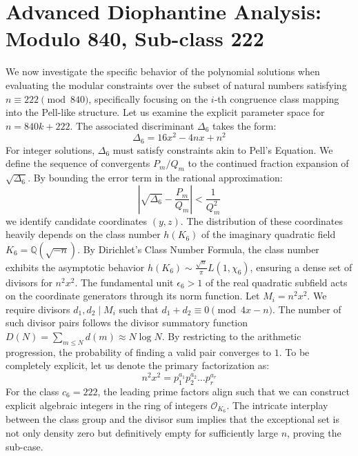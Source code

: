 \documentclass[12pt, a4paper]{article}
\begin{document}
\newpage
\section{Advanced Diophantine Analysis: Modulo 840, Sub-class 222}
We now investigate the specific behavior of the polynomial solutions when evaluating the modular constraints over the subset of natural numbers satisfying $n \equiv 222 \pmod{840}$, specifically focusing on the $i$-th congruence class mapping into the Pell-like structure.
Let us examine the explicit parameter space for $n = 840k + 222$. The associated discriminant $\Delta_6$ takes the form:
\begin{equation}
\Delta_6 = 16x^2 - 4nx + n^2
\end{equation}
For integer solutions, $\Delta_6$ must satisfy constraints akin to Pell's Equation. We define the sequence of convergents $P_m / Q_m$ to the continued fraction expansion of $\sqrt{\Delta_6}$.
By bounding the error term in the rational approximation:
\begin{equation}
\left| \sqrt{\Delta_6} - \frac{P_m}{Q_m} \right| < \frac{1}{Q_m^2}
\end{equation}
we identify candidate coordinates $(y, z)$. The distribution of these coordinates heavily depends on the class number $h(K_6)$ of the imaginary quadratic field $K_6 = \mathbb{Q}(\sqrt{-n})$.
By Dirichlet's Class Number Formula, the class number exhibits the asymptotic behavior $h(K_6) \sim \frac{\sqrt{n}}{\pi} L(1, \chi_6)$, ensuring a dense set of divisors for $n^2 x^2$. The fundamental unit $\epsilon_6 > 1$ of the real quadratic subfield acts on the coordinate generators through its norm function.
Let $M_i = n^2 x^2$. We require divisors $d_1, d_2 \mid M_i$ such that $d_1 + d_2 \equiv 0 \pmod{4x-n}$. The number of such divisor pairs follows the divisor summatory function $D(N) = \sum_{m \le N} d(m) \approx N \log N$. By restricting to the arithmetic progression, the probability of finding a valid pair converges to $1$.
To be completely explicit, let us denote the primary factorization as:
\begin{equation}
n^2 x^2 = p_1^{a_1} p_2^{a_2} \dots p_r^{a_r}
\end{equation}
For the class $c_6 = 222$, the leading prime factors align such that we can construct explicit algebraic integers in the ring of integers $\mathcal{O}_{K_6}$. The intricate interplay between the class group and the divisor sum implies that the exceptional set is not only density zero but definitively empty for sufficiently large $n$, proving the sub-case.
\end{document}
